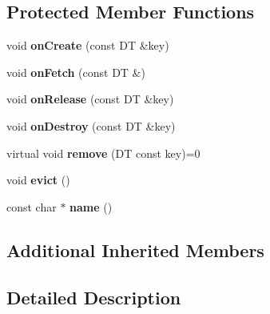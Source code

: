 \subsection*{Protected Member Functions}
\begin{DoxyCompactItemize}
\item 
\hypertarget{classLoki_1_1EvictAging_ac4a0cdf80f22d98ad696da91dcb1e4d5}{}void {\bfseries on\+Create} (const D\+T \&key)\label{classLoki_1_1EvictAging_ac4a0cdf80f22d98ad696da91dcb1e4d5}

\item 
\hypertarget{classLoki_1_1EvictAging_a382ba43c28b7864b9678e9457c778cee}{}void {\bfseries on\+Fetch} (const D\+T \&)\label{classLoki_1_1EvictAging_a382ba43c28b7864b9678e9457c778cee}

\item 
\hypertarget{classLoki_1_1EvictAging_a8b71ad6ad6295fe27316cc2f65faa3d0}{}void {\bfseries on\+Release} (const D\+T \&key)\label{classLoki_1_1EvictAging_a8b71ad6ad6295fe27316cc2f65faa3d0}

\item 
\hypertarget{classLoki_1_1EvictAging_a5539815b5f6e90c39875775b38b373c6}{}void {\bfseries on\+Destroy} (const D\+T \&key)\label{classLoki_1_1EvictAging_a5539815b5f6e90c39875775b38b373c6}

\item 
\hypertarget{classLoki_1_1EvictAging_aa7ba9b1fe6f933064eca5bbfa7796427}{}virtual void {\bfseries remove} (D\+T const key)=0\label{classLoki_1_1EvictAging_aa7ba9b1fe6f933064eca5bbfa7796427}

\item 
\hypertarget{classLoki_1_1EvictAging_a65bf1f39e6d12ed9ed7f0ee24ef7c155}{}void {\bfseries evict} ()\label{classLoki_1_1EvictAging_a65bf1f39e6d12ed9ed7f0ee24ef7c155}

\item 
\hypertarget{classLoki_1_1EvictAging_a3da86be442d6a3455bbe6e2e1ac3be15}{}const char $\ast$ {\bfseries name} ()\label{classLoki_1_1EvictAging_a3da86be442d6a3455bbe6e2e1ac3be15}

\end{DoxyCompactItemize}
\subsection*{Additional Inherited Members}


\subsection{Detailed Description}

